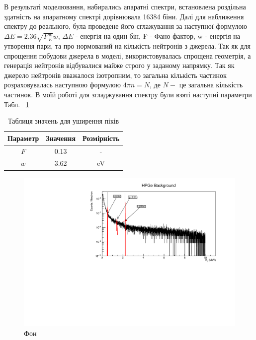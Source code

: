 \documentclass[a4paper, 14pt]{article}
\numberwithin{equation}{section}
\numberwithin{table}{section}
\begin{document}
В результаті моделювання, набирались апаратні спектри, встановлена роздільна здатність на апаратному спектрі дорівнювала 16384 біни. Далі для наближення спектру до реального, була проведене його сглажування за наступної формулою $\Delta{E} = 2.36 \sqrt{F  \frac{w}{E}}  w$, $\Delta{E}$ - енергія на один бін, F - Фано фактор, w - енергія на утворення пари, та про нормований на кількість нейтронів з джерела. Так як для спрощення побудови джерела в моделі, використовувалась спрощена геометрія, а генерація нейтронів відбувалися майже строго у заданому напрямку. Так як джерело нейтронів вважалося ізотропним, то загальна кількість частинок розраховувалась наступною формулою $ 4 \pi n = N$, де $N -$ це загальна кількість частинок. В моїй роботі для згладжування спектру були взяті наступні параметри Табл. ~\ref{tabl:Param}
\begin{table}[h]
	\centering
	\begin{tabular}{|c|c|c|} 
		\hline
		Параметр & Значення &  Розмірність \\
		\hline
		$F$ & 0.13 & - \\
		\hline
		$w$ & 3.62 & eV \\		
		\hline
	\end{tabular}
	\caption{Таблиця значень для уширення піків} 
	\label{tabl:Param}
\end{table}
\begin{figure}[hbt!]
	\centering \includegraphics[width=1\textwidth]{res/background.pdf}
	\caption{Фон} 
	\label{ris:FonPicks}	
\end{figure} 
\end{document}
